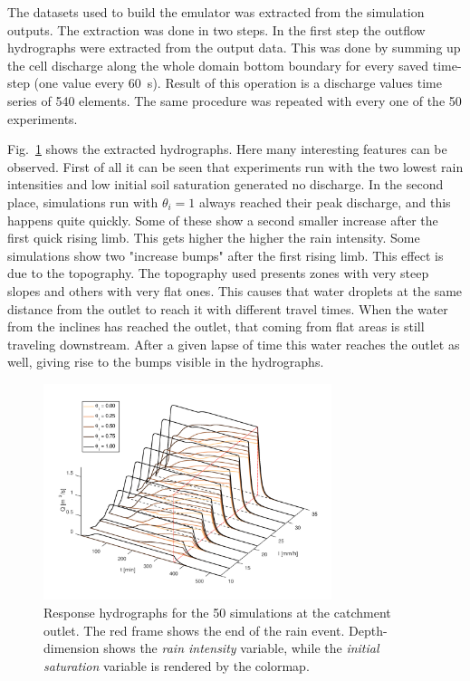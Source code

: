 The datasets used to build the emulator was extracted from the simulation outputs.
The extraction was done in two steps.
In the first step the outflow hydrographs were extracted from the output data. 
This was done by summing up the cell discharge along the whole domain bottom boundary for every saved time-step (one value every \SI{60}{\second}).
Result of this operation is a discharge values time series of \num{540} elements.
The same procedure was repeated with every one of the \num{50} experiments.

Fig.~\ref{fig:hydrographs3d} shows the extracted hydrographs.
Here many interesting features can be observed.
First of all it can be seen that experiments run with the two lowest rain intensities and low initial soil saturation generated no discharge.
In the second place, simulations run with $\theta_i = \num{1}$ always reached their peak discharge, and this happens quite quickly.
Some of these show a second smaller increase after the first quick rising limb.
This gets higher the higher the rain intensity.
Some simulations show two "increase bumps" after the first rising limb.
This effect is due to the topography.
The topography used presents zones with very steep slopes and others with very flat ones.
This causes that water droplets at the same distance from the outlet to reach it with different travel times.
When the water from the inclines has reached the outlet, that coming from flat areas is still traveling downstream.
After a given lapse of time this water reaches the outlet as well, giving rise to the bumps visible in the hydrographs.\\

\begin{figure}[h]
  \centering
  \includegraphics[width=0.75\textwidth]{Figures/hydrographs3d.png}
  \caption{Response hydrographs for the \num{50} simulations at the catchment outlet. The red frame shows the end of the rain event. Depth-dimension shows the \emph{rain intensity} variable, while the \emph{initial saturation} variable is rendered by the colormap.}
  \label{fig:hydrographs3d}
\end{figure}

